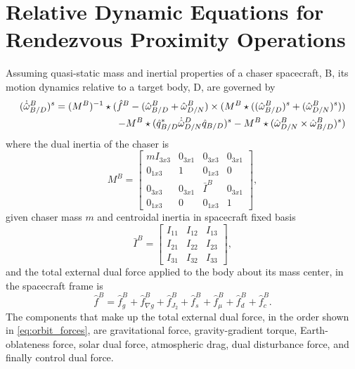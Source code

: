 \documentclass[letterpaper, preprint, paper,11pt]{AAS}	%
\begin{document}
\section{Relative Dynamic Equations for Rendezvous Proximity Operations}
Assuming quasi-static mass and inertial properties of a chaser spacecraft, B, its motion dynamics relative to a target body, D, are governed by
\begin{equation}
\begin{aligned}
	\label{eq:dyn}
	(\dot{\hat{\omega}}^B_{B/D})^s = (M^B)^{-1}\star(\hat{f}^B-(\hat{\omega}^B_{B/D}+\hat{\omega}^B_{D/N})\times(M^B\star((\hat{\omega}^B_{B/D})^s+(\hat{\omega}^B_{D/N})^s))\\-M^B\star(\hat{q}^*_{B/D}\dot{\hat{\omega}}^D_{D/N}\hat{q}_{B/D})^s-M^B\star(\hat{\omega}^B_{D/N}\times\hat{\omega}^B_{B/D})^s)
\end{aligned}\\
\end{equation}
where the dual inertia of the chaser is
\begin{equation}
\label{eq:dual_inertia}
M^B = 
\begin{bmatrix} 
mI_{3x3} & 0_{3x1} & 0_{3x3} & 0_{3x1} \\ 
0_{1x3} & 1 & 0_{1x3} & 0 \\ 
0_{3x3} & 0_{3x1} & \bar{I}^B & 0_{3x1} \\ 
0_{1x3} & 0 & 0_{1x3} & 1 
\end{bmatrix}, 
\end{equation}
given chaser mass $m$ and centroidal inertia in spacecraft fixed basis
\begin{equation}
\label{eq:sc_inertia}
\bar{I}^B = 
\begin{bmatrix} 
I_{11} & I_{12}& I_{13} \\ 
I_{21} & I_{22}& I_{23}\\ 
I_{31} & I_{32}& I_{33}
\end{bmatrix},
\end{equation}
and the total external dual force applied to the body about its mass center, in the spacecraft frame is
\begin{equation}
\label{eq:orbit_forces}
\hat{f}^B = \hat{f}^B_g + \hat{f}^B_{\nabla g} + \hat{f}^B_{J_2} +\hat{f}^B_{s}+\hat{f}^B_{\mu} + \hat{f}^B_d + \hat{f}^B_c.
\end{equation}
The components that make up the total external dual force, in the order shown in \eqref{eq:orbit_forces}, are gravitational force, gravity-gradient torque, Earth-oblateness force, solar dual force, atmospheric drag, dual disturbance force, and finally control dual force.
\end{document}
